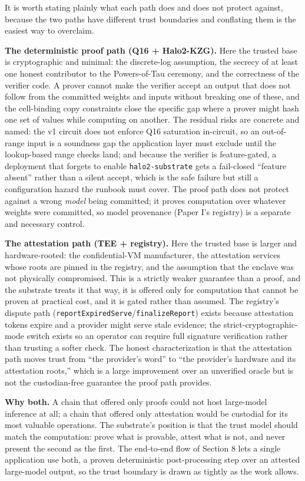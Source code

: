 It is worth stating plainly what each path does and does not protect
against, because the two paths have different trust boundaries and
conflating them is the easiest way to overclaim.

\textbf{The deterministic proof path (Q16 + Halo2-KZG).} Here the
trusted base is cryptographic and minimal: the discrete-log assumption,
the secrecy of at least one honest contributor to the Powers-of-Tau
ceremony, and the correctness of the verifier code. A prover cannot make
the verifier accept an output that does not follow from the committed
weights and inputs without breaking one of these, and the cell-binding
copy constraints close the specific gap where a prover might hash one
set of values while computing on another. The residual risks are
concrete and named: the v1 circuit does not enforce Q16 saturation
in-circuit, so an out-of-range input is a soundness gap the application
layer must exclude until the lookup-based range checks land; and because
the verifier is feature-gated, a deployment that forgets to enable
\texttt{halo2-substrate} gets a fail-closed ``feature absent'' rather
than a silent accept, which is the safe failure but still a
configuration hazard the runbook must cover. The proof path does not
protect against a wrong \emph{model} being committed; it proves
computation over whatever weights were committed, so model provenance
(Paper I's registry) is a separate and necessary control.

\textbf{The attestation path (TEE + registry).} Here the trusted base is
larger and hardware-rooted: the confidential-VM manufacturer, the
attestation services whose roots are pinned in the registry, and the
assumption that the enclave was not physically compromised. This is a
strictly weaker guarantee than a proof, and the substrate treats it that
way, it is offered only for computation that cannot be proven at
practical cost, and it is gated rather than assumed. The registry's
dispute path (\texttt{reportExpiredServe}/\texttt{finalizeReport})
exists because attestation tokens expire and a provider might serve
stale evidence; the strict-cryptographic-mode switch exists so an
operator can require full signature verification rather than trusting a
softer check. The honest characterization is that the attestation path
moves trust from ``the provider's word'' to ``the provider's hardware
and its attestation roots,'' which is a large improvement over an
unverified oracle but is not the custodian-free guarantee the proof path
provides.

\textbf{Why both.} A chain that offered only proofs could not host
large-model inference at all; a chain that offered only attestation
would be custodial for its most valuable operations. The substrate's
position is that the trust model should match the computation: prove
what is provable, attest what is not, and never present the second as
the first. The end-to-end flow of Section 8 lets a single application
use both, a proven deterministic post-processing step over an attested
large-model output, so the trust boundary is drawn as tightly as the
work allows.

